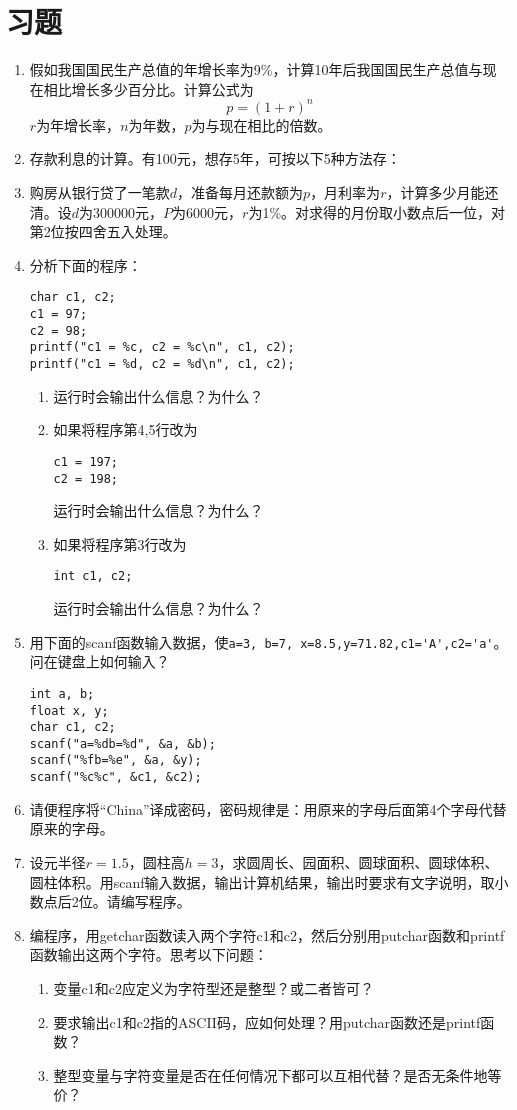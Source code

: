 \section{习题}
\begin{enumerate}
	\item 假如我国国民生产总值的年增长率为9\%，计算10年后我国国民生产总值与现在相比增长多少百分比。计算公式为
		\begin{equation}
			p = (1 + r)^n
		\end{equation}
		$r$为年增长率，$n$为年数，$p$为与现在相比的倍数。
	\item 存款利息的计算。有100元，想存5年，可按以下5种方法存：
	\item 购房从银行贷了一笔款$d$，准备每月还款额为$p$，月利率为$r$，计算多少月能还清。设$d$为300000元，$P$为6000元，$r$为1\%。对求得的月份取小数点后一位，对第2位按四舍五入处理。
	\item 分析下面的程序：
		\begin{lstlisting}
char c1, c2;
c1 = 97;
c2 = 98;
printf("c1 = %c, c2 = %c\n", c1, c2);
printf("c1 = %d, c2 = %d\n", c1, c2);
		\end{lstlisting}
		\begin{enumerate}
			\item 运行时会输出什么信息？为什么？
			\item 如果将程序第4,5行改为
				\begin{lstlisting}
c1 = 197;
c2 = 198;
				\end{lstlisting}
				运行时会输出什么信息？为什么？
			\item 如果将程序第3行改为
				\begin{lstlisting}
int c1, c2;
				\end{lstlisting}
				运行时会输出什么信息？为什么？
		\end{enumerate}

	\item 用下面的scanf函数输入数据，使\verb|a=3, b=7, x=8.5,y=71.82,c1='A',c2='a'|。问在键盘上如何输入？
		\begin{lstlisting}
int a, b;
float x, y;
char c1, c2;
scanf("a=%db=%d", &a, &b);
scanf("%fb=%e", &a, &y);
scanf("%c%c", &c1, &c2);
		\end{lstlisting}
	\item 请便程序将“China”译成密码，密码规律是：用原来的字母后面第4个字母代替原来的字母。
	\item 设元半径$r=1.5$，圆柱高$h=3$，求圆周长、园面积、圆球面积、圆球体积、圆柱体积。用scanf输入数据，输出计算机结果，输出时要求有文字说明，取小数点后2位。请编写程序。
	\item 编程序，用getchar函数读入两个字符c1和c2，然后分别用putchar函数和printf函数输出这两个字符。思考以下问题：
		\begin{enumerate}
			\item 变量c1和c2应定义为字符型还是整型？或二者皆可？
			\item 要求输出c1和c2指的ASCII码，应如何处理？用putchar函数还是printf函数？
			\item 整型变量与字符变量是否在任何情况下都可以互相代替？是否无条件地等价？
		\end{enumerate}
		
\end{enumerate}
